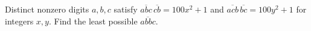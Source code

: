 Distinct nonzero digits $a,b,c$ satisfy $\overline{abc}\,\overline{cb}=100x^2+1$ and $\overline{acb}\,\overline{bc}=100y^2+1$ for integers $x,y$. Find the least possible $\overline{abbc}$.
